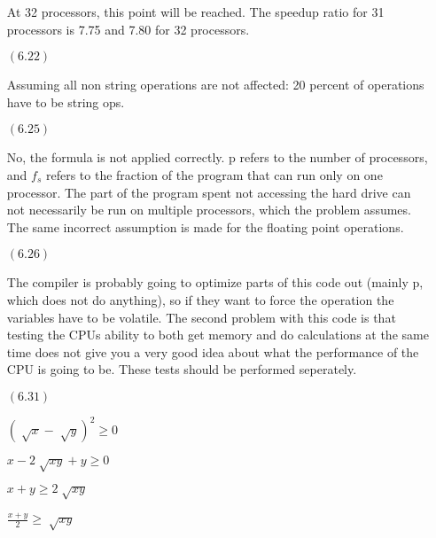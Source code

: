 \documentclass[letterpaper,10pt,titlepage]{article}
\begin{document}
\begin{enumerate}
  At 32 processors, this point will be reached.
  The speedup ratio for 31 processors is 7.75 and 7.80 for 32 processors.
  
\item[$(6.22)$]

  Assuming all non string operations are not affected: 20 percent of operations have to be string ops.

\item[$(6.25)$]
  
  No, the formula is not applied correctly.
  p refers to the number of processors, and $f_{s}$ refers to the fraction of the program that can run only on one processor.
  The part of the program spent not accessing the hard drive can not necessarily be run on multiple processors, which the problem assumes.
  The same incorrect assumption is made for the floating point operations.
  
\item[$(6.26)$]

  The compiler is probably going to optimize parts of this code out (mainly p, which does not do anything), so if they want to force the operation the variables have to be volatile.
  The second problem with this code is that testing the CPUs ability to both get memory and do calculations at the same time does not give you a very good idea about what the 
  performance of the CPU is going to be. These tests should be performed seperately.

\item[$(6.31)$]

  $(\sqrt[]{x} - \sqrt[]{y})^2  \geq  0$
  
  $x - 2\sqrt[]{xy} + y  \geq  0$
  
  $x + y  \geq  2\sqrt[]{xy}$
  
  $\frac{x + y}{2}  \geq  \sqrt[]{xy}$

\end{enumerate}
\end{document}
